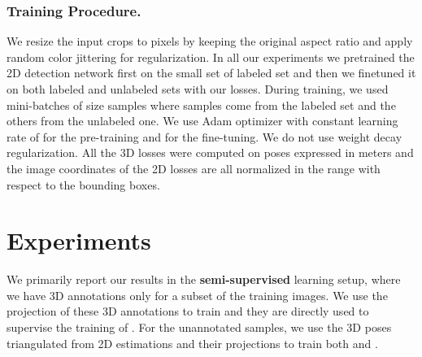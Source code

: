 \documentclass[runningheads]{llncs}
\begin{document}
\subsubsection*{Training Procedure.}
We resize the input crops to  pixels by keeping the original aspect ratio and apply random color jittering for regularization.
In all our experiments we pretrained the 2D detection network first on the small set of labeled set and then we finetuned it on both labeled and unlabeled sets with our losses. During training, we used mini-batches of size  samples where  samples come from the labeled set and the others from the unlabeled one. We use Adam optimizer \cite{Kingma15} with constant learning rate of  for the pre-training and  for the fine-tuning. We do not use weight decay regularization. All the 3D losses were computed on poses expressed in meters and the image coordinates of the 2D losses are all normalized in the range  with respect to the bounding boxes. \section{Experiments}
\label{sec:exp}

We primarily report our results in the \textbf{semi-supervised} learning setup, where we have 3D annotations only for a subset of the training images. We use the projection of these 3D annotations to train  and they are directly used to supervise the training of . For the unannotated samples, we use the 3D poses triangulated from 2D estimations and their projections to train both  and .
\end{document}
